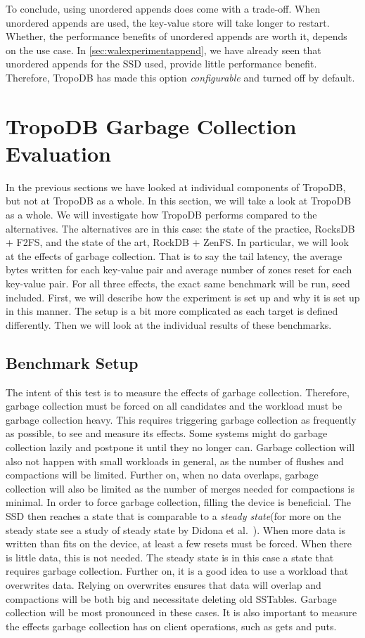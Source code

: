 To conclude, using unordered appends does come with a trade-off. When unordered appends are used, the key-value store will take longer to restart. Whether, the performance benefits of unordered appends are worth it, depends on the use case. In \autoref{sec:walexperimentappend}, we have already seen that unordered appends for the SSD used, provide little performance benefit. Therefore, TropoDB has made this option \textit{configurable} and turned off by default.

\section{TropoDB Garbage Collection Evaluation}
\label{sec:glob}
In the previous sections we have looked at individual components of TropoDB, but not at TropoDB as a whole. In this section, we will take a look at TropoDB as a whole. We will investigate how TropoDB performs compared to the alternatives. The alternatives are in this case: the state of the practice, RocksDB + F2FS, and the state of the art, RockDB + ZenFS. In particular, we will look at the effects of garbage collection. That is to say the tail latency, the average bytes written for each key-value pair and average number of zones reset for each key-value pair. For all three effects, the exact same benchmark will be run, seed included. First, we will describe how the experiment is set up and why it is set up in this manner. The setup is a bit more complicated as each target is defined differently. Then we will look at the individual results of these benchmarks. 

\subsection{Benchmark Setup}
The intent of this test is to measure the effects of garbage collection. Therefore, garbage collection must be forced on all candidates and the workload must be garbage collection heavy. This requires triggering garbage collection as frequently as possible, to see and measure its effects. Some systems might do garbage collection lazily and postpone it until they no longer can. Garbage collection will also not happen with small workloads in general, as the number of flushes and compactions will be limited. Further on, when no data overlaps, garbage collection will also be limited as the number of merges needed for compactions is minimal. In order to force garbage collection, filling the device is beneficial. The SSD then reaches a state that is comparable to a \textit{steady state}(for more on the steady state see a study of steady state by Didona et al.~\cite{didona2020toward}). When more data is written than fits on the device, at least a few resets must be forced. When there is little data, this is not needed. The steady state is in this case a state that requires garbage collection. Further on, it is a good idea to use a workload that overwrites data. Relying on overwrites ensures that data will overlap and compactions will be both big and necessitate deleting old SSTables. Garbage collection will be most pronounced in these cases. It is also important to measure the effects garbage collection has on client operations, such as gets and puts.

